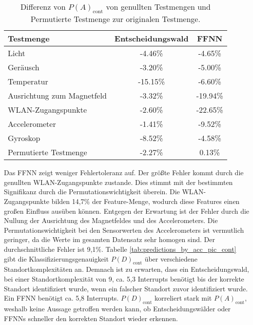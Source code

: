 \begin{table}[h!]
    \centering
    \begin{tabular}{ | l | c | c | }
        \hline
        Testmenge & Entscheidungswald & FFNN \\\hline
        Licht & -4.46\% & -4.65\% \\\hline
        Geräusch & -3.20\% & -5.00\% \\\hline
        Temperatur & -15.15\% & -6.60\% \\\hline
        Ausrichtung zum Magnetfeld & -3.32\% & -19.94\% \\\hline
        WLAN-Zugangspunkte & -2.60\% & -22.65\% \\\hline
        Accelerometer & -1.41\% & -9.52\% \\\hline
        Gyroskop & -8.52\% & -4.58\% \\\hline
        Permutierte Testmenge & -2.27\% & 0.13\% \\\hline
    \end{tabular}
    \caption{Differenz von $P(A)_{\text{cont}}$ von genullten Testmengen und Permutierte Testmenge zur originalen Testmenge.}
    \label{tab:robustness_by_acc_cont}
\end{table}
\newline
\newline
Das FFNN zeigt weniger Fehlertoleranz auf.
Der größte Fehler kommt durch die genullten WLAN-Zugangspunkte zustande.
Dies stimmt mit der bestimmten Signifikanz durch die Permutationswichtigkeit überein.
Die WLAN-Zugangspunkte bilden 14,7\% der Feature-Menge, wodurch diese Features einen großen Einfluss ausüben können.
Entgegen der Erwartung ist der Fehler durch die Nullung der Ausrichtung des Magnetfeldes und des Accelerometers.
Die Permutationswichtigkeit bei den Sensorwerten des Accelerometers ist vermutlich geringer,
da die Werte im gesamten Datensatz sehr homogen sind.
Der durchschnittliche Fehler ist 9,1\%.
\newline
\newline
Tabelle \ref{tab:predictions_by_acc_pic_cont} gibt die Klassifizierungsgenauigkeit $P(D)_{\text{cont}}$ über verschiedene Standortkomplexitäten an.
Demnach ist zu erwarten, dass ein Entscheidungswald, bei einer Standortkomplexität von 9, ca. 5,3 Interrupts benötigt bis der korrekte Standort identifiziert wurde,
wenn ein falscher Standort zuvor identifiziert wurde.
Ein FFNN benötigt ca. 5,8 Interrupts.
$P(D)_{\text{cont}}$ korreliert stark mit $P(A)_{\text{cont}}$, weshalb keine Aussage getroffen werden kann, ob Entscheidungswälder oder FFNNs schneller den korrekten Standort wieder erkennen.
